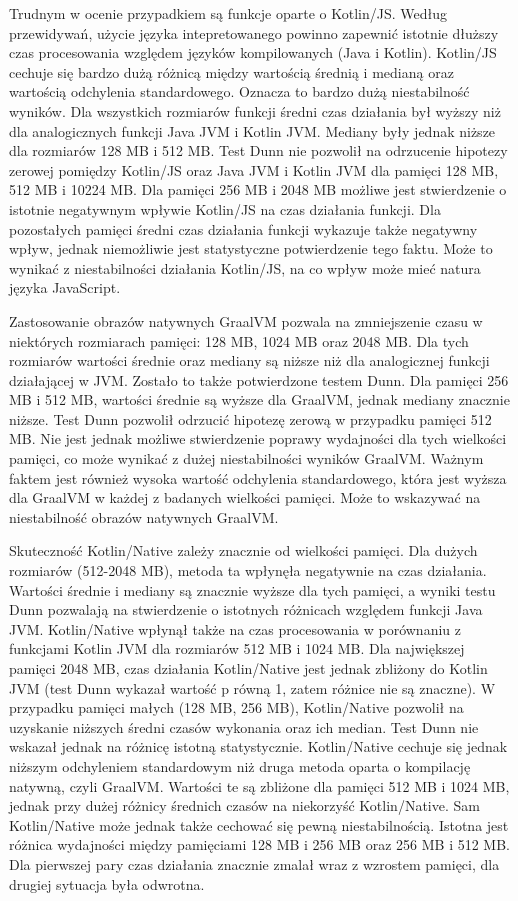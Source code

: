 Trudnym w ocenie przypadkiem są funkcje oparte o Kotlin/JS.
Według przewidywań, użycie języka intepretowanego powinno zapewnić istotnie dłuższy czas procesowania względem języków kompilowanych (Java i Kotlin).
Kotlin/JS cechuje się bardzo dużą różnicą między wartością średnią i medianą oraz wartością odchylenia standardowego.
Oznacza to bardzo dużą niestabilność wyników.
Dla wszystkich rozmiarów funkcji średni czas działania był wyższy niż dla analogicznych funkcji Java JVM i Kotlin JVM.
Mediany były jednak niższe dla rozmiarów 128 MB i 512 MB.
Test Dunn nie pozwolił na odrzucenie hipotezy zerowej pomiędzy Kotlin/JS oraz Java JVM i Kotlin JVM dla pamięci 128 MB, 512 MB i 10224 MB.
Dla pamięci 256 MB i 2048 MB możliwe jest stwierdzenie o istotnie negatywnym wpływie Kotlin/JS na czas działania funkcji.
Dla pozostałych pamięci średni czas działania funkcji wykazuje także negatywny wpływ, jednak niemożliwie jest statystyczne potwierdzenie tego faktu.
Może to wynikać z niestabilności działania Kotlin/JS, na co wpływ może mieć natura języka JavaScript.

Zastosowanie obrazów natywnych GraalVM pozwala na zmniejszenie czasu w niektórych rozmiarach pamięci: 128 MB, 1024 MB oraz 2048 MB.
Dla tych rozmiarów wartości średnie oraz mediany są niższe niż dla analogicznej funkcji działającej w JVM.
Zostało to także potwierdzone testem Dunn.
Dla pamięci 256 MB i 512 MB, wartości średnie są wyższe dla GraalVM, jednak mediany znacznie niższe.
Test Dunn pozwolił odrzucić hipotezę zerową w przypadku pamięci 512 MB.
Nie jest jednak możliwe stwierdzenie poprawy wydajności dla tych wielkości pamięci, co może wynikać z dużej niestabilności wyników GraalVM.
Ważnym faktem jest również wysoka wartość odchylenia standardowego, która jest wyższa dla GraalVM w każdej z badanych wielkości pamięci.
Może to wskazywać na niestabilność obrazów natywnych GraalVM.

Skuteczność Kotlin/Native zależy znacznie od wielkości pamięci.
Dla dużych rozmiarów (512-2048 MB), metoda ta wpłynęła negatywnie na czas działania.
Wartości średnie i mediany są znacznie wyższe dla tych pamięci, a wyniki testu Dunn pozwalają na stwierdzenie o istotnych różnicach względem funkcji Java JVM. 
Kotlin/Native wpłynął także na czas procesowania w porównaniu z funkcjami Kotlin JVM dla rozmiarów 512 MB i 1024 MB.
Dla największej pamięci 2048 MB, czas działania Kotlin/Native jest jednak zbliżony do Kotlin JVM (test Dunn wykazał wartość p równą 1, zatem różnice nie są znaczne).
W przypadku pamięci małych (128 MB, 256 MB), Kotlin/Native pozwolił na uzyskanie niższych średni czasów wykonania oraz ich median.
Test Dunn nie wskazał jednak na różnicę istotną statystycznie.
Kotlin/Native cechuje się jednak niższym odchyleniem standardowym niż druga metoda oparta o kompilację natywną, czyli GraalVM.
Wartości te są zbliżone dla pamięci 512 MB i 1024 MB, jednak przy dużej różnicy średnich czasów na niekorzyść Kotlin/Native.
Sam Kotlin/Native może jednak także cechować się pewną niestabilnością.
Istotna jest różnica wydajności między pamięciami 128 MB i 256 MB oraz 256 MB i 512 MB.
Dla pierwszej pary czas działania znacznie zmalał wraz z wzrostem pamięci, dla drugiej sytuacja była odwrotna.

